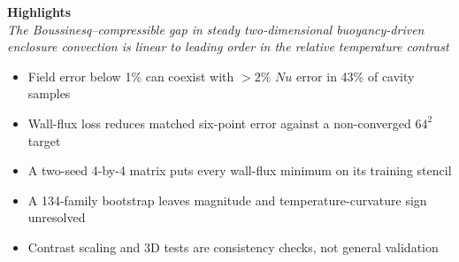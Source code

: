 \documentclass[11pt]{article}
\begin{document}
\begin{center}
{\large\bfseries Highlights}\\[2pt]
{\itshape The Boussinesq--compressible gap in steady two-dimensional buoyancy-driven}\\[2pt]
{\itshape enclosure convection is linear to leading order in the relative temperature contrast}\\[10pt]
\end{center}
\begin{itemize}\setlength{\itemsep}{6pt}
\item Field error below 1\% can coexist with $>2\%$ $Nu$ error in 43\% of cavity samples
\item Wall-flux loss reduces matched six-point error against a non-converged $64^2$ target
\item A two-seed 4-by-4 matrix puts every wall-flux minimum on its training stencil
\item A 134-family bootstrap leaves magnitude and temperature-curvature sign unresolved
\item Contrast scaling and 3D tests are consistency checks, not general validation
\end{itemize}
\end{document}
